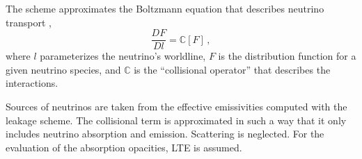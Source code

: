 The scheme approximates the Boltzmann equation that describes 
neutrino transport \citep{Thorne:1981}, 
\begin{equation*}
\frac{D F}{D l} = \mathbb{C}[F]\, ,
\end{equation*}
where $l$ parameterizes the neutrino's worldline, 
$F$ is the distribution function for a given neutrino species, and $\mathbb{C}$ 
is the ``collisional operator'' that describes the interactions.
%

Sources of neutrinos are taken from the effective emissivities computed 
with the leakage scheme.
The collisional term is approximated in such a way that it only includes neutrino 
absorption and emission. Scattering is neglected. 
For the evaluation of the absorption opacities, 
 \ac{LTE} is assumed.
%
%
